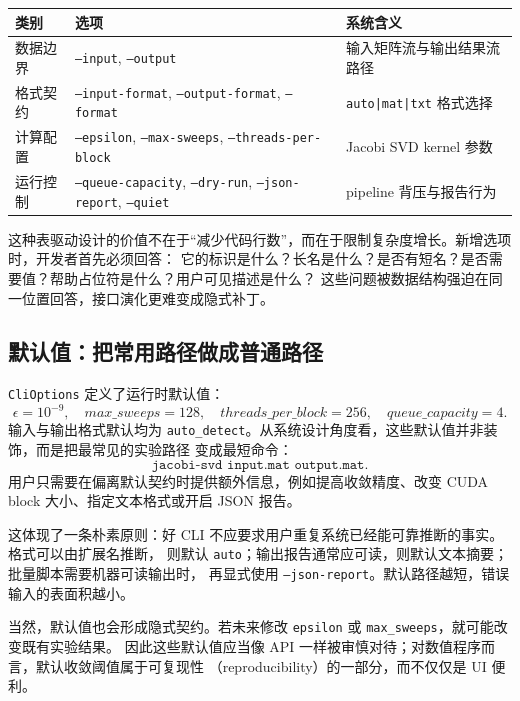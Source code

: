 \begin{table}[htbp]
    \centering
    \small
    \begin{tabular}{p{}p{}p{}}
        \toprule
        类别 & 选项 & 系统含义 \\
        \midrule
        数据边界 & \texttt{--input}, \texttt{--output} & 输入矩阵流与输出结果流路径 \\
        格式契约 & \texttt{--input-format}, \texttt{--output-format}, \texttt{--format} & \texttt{auto|mat|txt} 格式选择 \\
        计算配置 & \texttt{--epsilon}, \texttt{--max-sweeps}, \texttt{--threads-per-block} & Jacobi SVD kernel 参数 \\
        运行控制 & \texttt{--queue-capacity}, \texttt{--dry-run}, \texttt{--json-report}, \texttt{--quiet} & pipeline 背压与报告行为 \\
        \bottomrule
    \end{tabular}
\end{table}

这种表驱动设计的价值不在于“减少代码行数”，而在于限制复杂度增长。新增选项时，开发者首先必须回答：
它的标识是什么？长名是什么？是否有短名？是否需要值？帮助占位符是什么？用户可见描述是什么？
这些问题被数据结构强迫在同一位置回答，接口演化更难变成隐式补丁。

\subsection{默认值：把常用路径做成普通路径}

\texttt{CliOptions} 定义了运行时默认值：
\[
    \epsilon=10^{-9},\quad
    max\_sweeps=128,\quad
    threads\_per\_block=256,\quad
    queue\_capacity=4.
\]
输入与输出格式默认均为 \texttt{auto\_detect}。从系统设计角度看，这些默认值并非装饰，而是把最常见的实验路径
变成最短命令：
\[
    \texttt{jacobi-svd input.mat output.mat}.
\]
用户只需要在偏离默认契约时提供额外信息，例如提高收敛精度、改变 CUDA block 大小、指定文本格式或开启 JSON 报告。

这体现了一条朴素原则：好 CLI 不应要求用户重复系统已经能可靠推断的事实。格式可以由扩展名推断，
则默认 \texttt{auto}；输出报告通常应可读，则默认文本摘要；批量脚本需要机器可读输出时，
再显式使用 \texttt{--json-report}。默认路径越短，错误输入的表面积越小。

当然，默认值也会形成隐式契约。若未来修改 \texttt{epsilon} 或 \texttt{max\_sweeps}，就可能改变既有实验结果。
因此这些默认值应当像 API 一样被审慎对待；对数值程序而言，默认收敛阈值属于可复现性
（reproducibility）的一部分，而不仅仅是 UI 便利。

